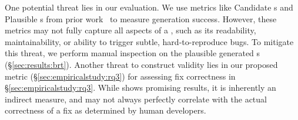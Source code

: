 One potential threat lies in our evaluation.
We use metrics like Candidate \brt{}s and Plausible \brt{}s from prior work~\cite{mundler2024swt} to measure \brt generation success. 
However, these metrics may not fully capture all aspects of a \brt, such as its readability, maintainability, or ability to trigger subtle, hard-to-reproduce bugs. 
To mitigate this threat, we perform manual inspection on the plausible generated \brt{}s  (\S\ref{sec:results:brt}). 
Another threat to construct validity lies in our proposed metric \enpassrate (\S\ref{sec:empiricalstudy:rq3}) for assessing fix correctness in \S\ref{sec:empiricalstudy:rq3}. 
While \enpassrate shows promising results, it is inherently an indirect measure, and may not always perfectly correlate with the actual correctness of a fix as determined by human developers.

